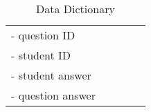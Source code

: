 \begin{table}[H]
{\begin{tabular}{ | l | l | l |l| p{5cm} |}
	   - question ID   		 &  				&    	&\\ 
	   - student ID		  	 &  		   		&  	 	&\\
	   - student answer	  	 &  		    	&   	&\\	   
	   - question answer  	 &               	&  		&\\ \hline 
								
    \hline
   
    \end{tabular}
    }
 \caption{Data Dictionary}
\end{table}

    

    



